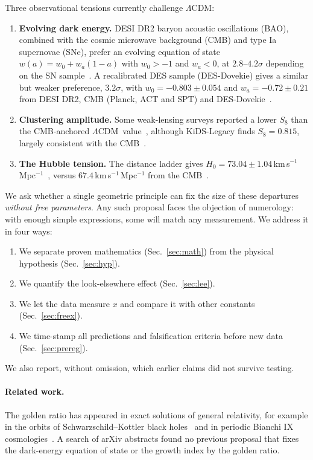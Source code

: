 \documentclass[11pt]{article}
\theoremstyle{definition}
\theoremstyle{remark}
\newcommand{\LCDM}{$\Lambda$CDM}
\begin{document}
Three observational tensions currently challenge \LCDM:
\begin{enumerate}
\item \textbf{Evolving dark energy.} DESI DR2 baryon acoustic oscillations (BAO), combined with the cosmic microwave background (CMB) and type Ia supernovae (SNe), prefer an evolving equation of state $w(a) = w_0 + w_a(1-a)$ with $w_0 > -1$ and $w_a < 0$, at $2.8$--$4.2\sigma$ depending on the SN sample~\cite{DESI-DR2}. A recalibrated DES sample (DES-Dovekie) gives a similar but weaker preference, $3.2\sigma$, with $w_0 = -0.803 \pm 0.054$ and $w_a = -0.72 \pm 0.21$ from DESI DR2, CMB (Planck, ACT and SPT) and DES-Dovekie~\cite{Dovekie}.
\item \textbf{Clustering amplitude.} Some weak-lensing surveys reported a lower $S_8$ than the CMB-anchored \LCDM\ value~\cite{DESY3}, although KiDS-Legacy finds $S_8 = 0.815$, largely consistent with the CMB~\cite{KiDSLegacy}.
\item \textbf{The Hubble tension.} The distance ladder gives $H_0 = 73.04 \pm 1.04$\,km\,s$^{-1}$\,Mpc$^{-1}$~\cite{SH0ES}, versus $67.4$\,km\,s$^{-1}$\,Mpc$^{-1}$ from the CMB~\cite{Planck2018}.
\end{enumerate}

We ask whether a single geometric principle can fix the size of these departures \emph{without free parameters}. Any such proposal faces the objection of numerology: with enough simple expressions, some will match any measurement. We address it in four ways:
\begin{enumerate}
\item We separate proven mathematics (Sec.~\ref{sec:math}) from the physical hypothesis (Sec.~\ref{sec:hyp}).
\item We quantify the look-elsewhere effect (Sec.~\ref{sec:lee}).
\item We let the data measure $x$ and compare it with other constants (Sec.~\ref{sec:freex}).
\item We time-stamp all predictions and falsification criteria before new data (Sec.~\ref{sec:prereg}).
\end{enumerate}
We also report, without omission, which earlier claims did not survive testing.

\paragraph{Related work.} The golden ratio has appeared in exact solutions of general relativity, for example in the orbits of Schwarzschild--Kottler black holes~\cite{CruzGolden} and in periodic Bianchi IX cosmologies~\cite{BryantHobill}. A search of arXiv abstracts found no previous proposal that fixes the dark-energy equation of state or the growth index by the golden ratio.
\end{document}
